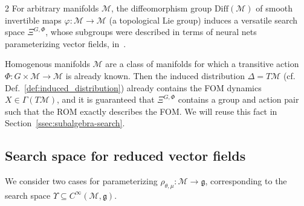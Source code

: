 \documentclass{article}
\newcommand{\M}{\mathcal{M}}                                %
\newcommand{\g}{\mathfrak{g}}                               %
\newcommand{\R}{\mathbb{R}}                                 %
\newcommand{\state}{x}
\newcommand{\Diff}{\mathrm{Diff}}
\begin{document}
\begin{multicols}{2}
For arbitrary manifolds $\M$, the diffeomorphism group $\Diff(\M)$ of smooth invertible maps $\varphi:\M\rightarrow\M$ (a topological Lie group) induces a versatile search space $\Xi^{G,\Phi}$, whose subgroups were described in terms of neural nets parameterizing vector fields, in~\cite{Kleikamp2022}.

Homogenous manifolds $\M$ are a class of manifolds for which a transitive action $\Phi:G\times\M\rightarrow\M$ is already known. Then the induced distribution $\Delta = T\M$ (cf. Def.~\ref{def:induced_distribution}) already contains the FOM dynamics $X\in \Gamma(T\M)$, and it is guaranteed that $\Xi^{G,\Phi}$ contains a group and action pair such that the ROM exactly describes the FOM. We will reuse this fact in Section~\ref{ssec:subalgebra-search}.


\subsection{Search space for reduced vector fields}
We consider two cases for parameterizing $\rho_{\theta,\mu}:\M\rightarrow\g$, corresponding to the search space $\Upsilon \subseteq C^\infty(\M,\g)$. %


\end{multicols}
\end{document}
